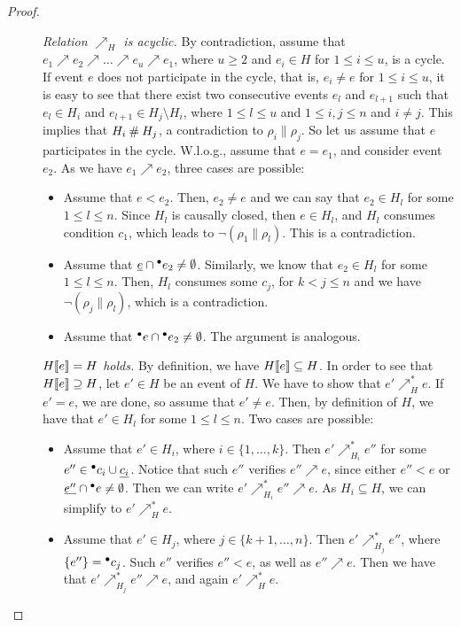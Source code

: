 \documentclass[12pt,a4paper]{article}
\newcommand{\confl}{\ensuremath\mathbin\#}
\begin{document}
\begin{proof}
\begin{description}
\item[] \emph{Relation $\nearrow_H$ is acyclic.}  By contradiction, assume that
$e_1 \nearrow e_2 \nearrow \ldots \nearrow e_u \nearrow e_1$, where $u \ge 2$
and $e_i \in H$ for $1 \le i \le u$, is a cycle.  If event $e$ does not
participate in the cycle, that is, $e_i \ne e$ for $1 \le i \le u$, it is easy
to see that there exist two consecutive events $e_l$ and $e_{l+1}$ such that
$e_l \in H_i$ and $e_{l+1} \in H_j \setminus H_i$, where $1 \le l \le u$ and $1
\le i, j \le n$ and $i \ne j$.  This implies that $H_i \confl H_j$, a
contradiction to $\rho_i \parallel \rho_j$.  So let us assume that $e$
participates in the cycle.  W.l.o.g., assume that $e = e_1$, and consider event
$e_2$.  As we have $e_1 \nearrow e_2$, three cases are possible:

\begin{itemize}
\item Assume that $e < e_2$.  Then, $e_2 \ne e$ and we can say that $e_2 \in
H_l$ for some $1 \le l \le n$.  Since $H_l$ is causally closed, then $e \in
H_l$, and $H_l$ consumes condition $c_1$, which leads to $\lnot (\rho_1
\parallel \rho_l)$.  This is a contradiction.

\item Assume that $\underline{e} \cap {}^\bullet e_2 \ne \emptyset$.  Similarly, we know
that $e_2 \in H_l$ for some $1 \le l \le n$.  Then, $H_l$ consumes some $c_j$,
for $k < j \le n$ and we have $\lnot (\rho_j \parallel \rho_l)$, which is a
contradiction.

\item Assume that ${}^\bullet e \cap {}^\bullet e_2 \ne \emptyset$.  The argument is
analogous.
\end{itemize}

\item[] \emph{$H[\![ e]\!] = H$ holds.}  By definition, we have $H[\![ e]\!]
\subseteq H$.  In order to see that $H[\![ e]\!] \supseteq H$, let $e' \in H$ be
an event of $H$.  We have to show that $e' \nearrow^*_H e$.  If $e' = e$, we
are done, so assume that $e' \ne e$.  Then, by definition of $H$, we have that
$e' \in H_l$ for some $1 \le l \le n$.  Two cases are possible:

\begin{itemize}
\item Assume that $e' \in H_i$, where $i \in \{1, \ldots, k\}$.  Then $e'
\nearrow^*_{H_i} e''$ for some $e'' \in {}^\bullet c_i \cup \underline{c_i}$.  Notice
that such $e''$ verifies $e'' \nearrow e$, since either $e'' < e$ or
$\underline{e''} \cap {}^\bullet e \ne \emptyset$.  Then we can write $e' \nearrow^*_{H_i}
e'' \nearrow e$.  As $H_i \subseteq H$, we can simplify to $e' \nearrow^*_H e$.

\item Assume that $e' \in H_j$, where $j \in \{k+1, \ldots, n\}$.  Then $e'
\nearrow^*_{H_j} e''$, where $\{e''\} = {}^\bullet c_j$.  Such $e''$ verifies $e'' <
e$, as well as $e'' \nearrow e$.  Then we have that $e' \nearrow^*_{H_j} e''
\nearrow e$, and again $e' \nearrow^*_H e$.
\end{itemize}
\end{description}
\end{proof}
\end{document}
